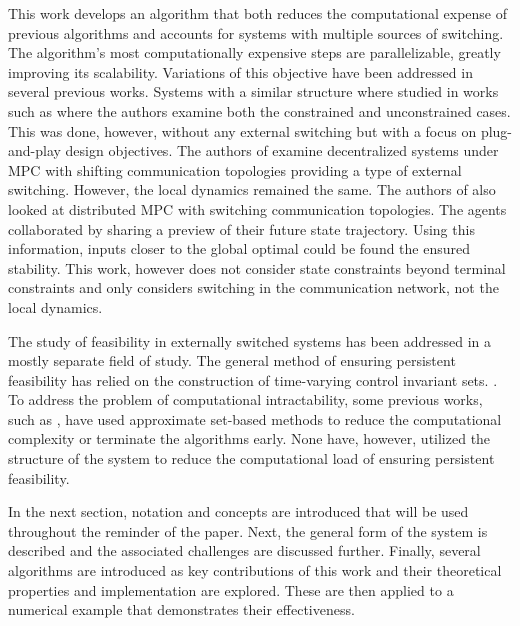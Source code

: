 This work develops an algorithm that both reduces the computational expense of previous algorithms and accounts for systems with multiple sources of switching. The algorithm's most computationally expensive steps are parallelizable, greatly improving its scalability. Variations of this objective have been addressed in several previous works. Systems with a similar structure where studied in works such as \cite{Riverso2015} where the authors examine both the constrained and unconstrained cases. This was done, however, without any external switching but with a focus on plug-and-play design objectives. The authors of \cite{Ahandani2020} examine decentralized systems under MPC with shifting communication topologies providing a type of external switching. However, the local dynamics remained the same. The authors of \cite{Li2020} also looked at distributed MPC with switching communication topologies. The agents collaborated by sharing a preview of their future state trajectory. Using this information, inputs closer to the global optimal could be found the ensured stability. This work, however does not consider state constraints beyond terminal constraints and only considers switching in the communication network, not the local dynamics. 

The study of feasibility in externally switched systems has been addressed in a mostly separate field of study. The general method of ensuring persistent feasibility has relied on the construction of time-varying control invariant sets. \cite{Santis2004, Zhang2016, Danielson2019}. To address the problem of computational intractability, some previous works, such as \cite{Santis2004}, have used approximate set-based methods to reduce the computational complexity or terminate the algorithms early. None have, however, utilized the structure of the system to reduce the computational load of ensuring persistent feasibility. 

In the next section, notation and concepts are introduced that will be used throughout the reminder of the paper. Next, the general form of the system is described and the associated challenges are discussed further. Finally, several algorithms are introduced as key contributions of this work and their theoretical properties and implementation are explored. These are then applied to a numerical example that demonstrates their effectiveness. 